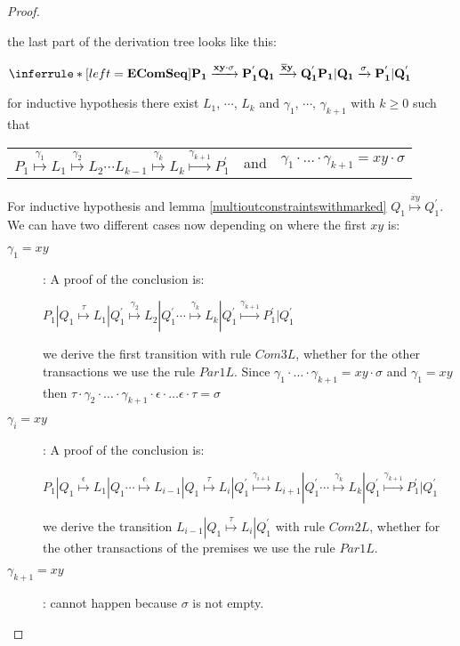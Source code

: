 \begin{proposition}
\begin{proof}
\begin{description}
	the last part of the derivation tree looks like this:
	\begin{center}
	  $\inferrule* [left=\bf{EComSeq}]{
	      P_{1} \xrightarrow{xy \cdot \sigma} P_{1}^{'}
	    \\
	      Q_{1} \xrightarrow{\overline{x}y} Q_{1}^{'}
	  }{
	    P_{1}|Q_{1} \xrightarrow{\sigma} P_{1}^{'}|Q_{1}^{'}
	  }$
	\end{center}
	for inductive hypothesis there exist $L_{1}$, $\cdots$, $L_{k}$ and $\gamma_{1}$, $\cdots$, $\gamma_{k+1}$ with $k\geq 0$ such that 
	\begin{center}
	  \begin{tabular}{lll}
	    $P_{1} \stackrel{\gamma_{1}}{\longmapsto} L_{1}  \stackrel{\gamma_{2}}{\longmapsto} L_{2} \cdots L_{k-1} \stackrel{\gamma_{k}}{\longmapsto} L_{k} \stackrel{\gamma_{k+1}}{\longmapsto} P_{1}^{'}$ 
	  &
	    and
	  &
	    $\gamma_{1} \cdot \ldots \cdot \gamma_{k+1} = xy \cdot \sigma$  
	  \end{tabular}
	\end{center}
	For inductive hypothesis and lemma \ref{multioutconstraintswithmarked} $Q_{1} \stackrel{\overline{x}y}{\longmapsto} Q_{1}^{'}$. We can have two different cases now depending on where the first $xy$ is:
	\begin{description}
	  \item[$\gamma_{1}=xy$]:
	    A proof of the conclusion is:
	    \begin{center}
	      $P_{1}|Q_{1} \stackrel{\tau}{\longmapsto} L_{1}|Q_{1}^{'}
			      \stackrel{\gamma_{2}}{\longmapsto} L_{2}|Q_{1}^{'}
		  \cdots
			      \stackrel{\gamma_{k}}{\longmapsto} L_{k}|Q_{1}^{'}
			      \stackrel{\gamma_{k+1}}{\longmapsto} P_{1}^{'}|Q_{1}^{'}$	  
	    \end{center}
	    we derive the first transition with rule $Com3L$, whether for the other transactions we use the rule $Par1L$. Since $\gamma_{1} \cdot \ldots \cdot \gamma_{k+1} = xy \cdot \sigma$ and $\gamma_{1}=xy$ then $\tau \cdot \gamma_{2}\cdot \ldots \cdot \gamma_{k+1}\cdot \epsilon \cdot \ldots \epsilon \cdot \tau=\sigma$
	  \item[$\gamma_{i}=xy$]:
	    A proof of the conclusion is:
	    \begin{center}
	      $P_{1}|Q_{1} \stackrel{\epsilon}{\longmapsto} L_{1}|Q_{1} 
		  \cdots
			      \stackrel{\epsilon}{\longmapsto} L_{i-1}|Q_{1} 
			      \stackrel{\tau}{\longmapsto} L_{i}|Q_{1}^{'}
			      \stackrel{\gamma_{i+1}}{\longmapsto} L_{i+1}|Q_{1}^{'}
		  \cdots 
			      \stackrel{\gamma_{k}}{\longmapsto} L_{k}|Q_{1}^{'}
			      \stackrel{\gamma_{k+1}}{\longmapsto} P_{1}^{'}|Q_{1}^{'}$	  
	    \end{center}
	    we derive the transition $ L_{i-1}|Q_{1} \stackrel{\tau}{\longmapsto} L_{i}|Q_{1}^{'}$ with rule $Com2L$, whether for the other transactions of the premises we use the rule $Par1L$.
	  \item[$\gamma_{k+1}=xy$]: cannot happen because $\sigma$ is not empty.
	\end{description}
    \end{description}
  \end{proof}
\end{proposition}

